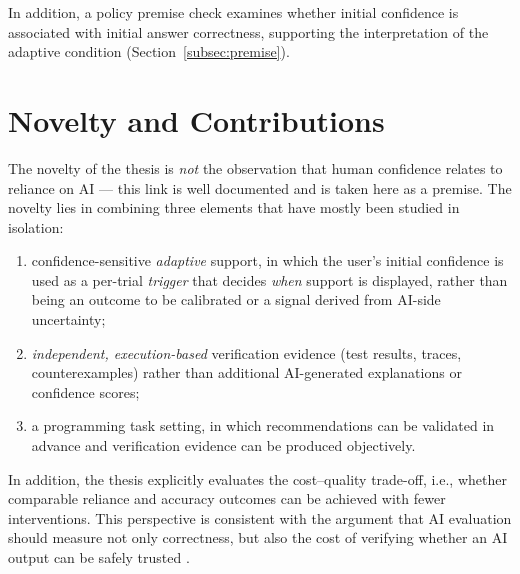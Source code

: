 \documentclass[oneside,final,14pt,a4paper]{extreport}
\theoremstyle{definition}
\theoremstyle{remark}
\begin{document}
In addition, a policy premise check examines whether initial confidence is
associated with initial answer correctness, supporting the interpretation of
the adaptive condition (Section~\ref{subsec:premise}).

\section{Novelty and Contributions}

The novelty of the thesis is \emph{not} the observation that human confidence
relates to reliance on AI --- this link is well documented
\cite{ToRelyOrNotToRely2024} and is taken here as a premise. The novelty lies
in combining three elements that have mostly been studied in isolation:
\begin{enumerate}
    \item confidence-sensitive \emph{adaptive} support, in which the user's
    initial confidence is used as a per-trial \emph{trigger} that decides
    \emph{when} support is displayed, rather than being an outcome to be
    calibrated or a signal derived from AI-side uncertainty;
    \item \emph{independent, execution-based} verification evidence (test
    results, traces, counterexamples) rather than additional AI-generated
    explanations or confidence scores;
    \item a programming task setting, in which recommendations can be validated
    in advance and verification evidence can be produced objectively.
\end{enumerate}

In addition, the thesis explicitly evaluates the cost--quality trade-off,
i.e., whether comparable reliance and accuracy outcomes can be achieved with
fewer interventions. This perspective is consistent with the argument that AI
evaluation should measure not only correctness, but also the cost of verifying
whether an AI output can be safely trusted
\cite{ToRelyOrNotToRely2024,VerificationCost2026}.
\end{document}
